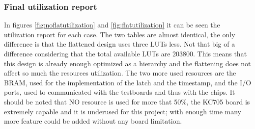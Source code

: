 \subsubsection{Final utilization report}
\noindent In figures \ref{fig:noflatutilization} and \ref{fig:flatutilization} it can be seen the utilization report for each case. The two tables are almost identical, the only difference is that the flattened design uses three LUTs less. Not that big of a difference considering that the total available LUTs are 203800. This means that this design is already enough optimized as a hierarchy and the flattening does not affect so much the resources utilization.
The two more used resources are the BRAM, used for the implementation of the latch and the timestamp, and the I/O ports, used to communicated with the testboards and thus with the chips.
It should be noted that NO resource is used for more that 50\%, the KC705 board is extremely capable and it is underused for this project; with enough time many more feature could be added without any board limitation. 
